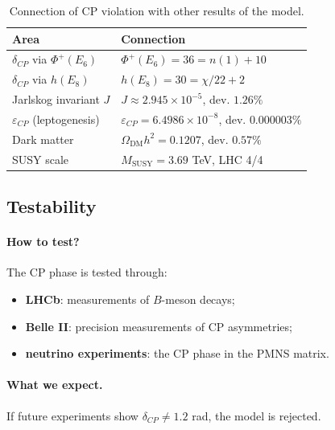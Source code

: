 \documentclass[11pt,a4paper]{article}
\newcommand{\MSUSY}{M_{\text{SUSY}}}
\theoremstyle{definition}
\begin{document}
\begin{table}[htbp]
\centering
\caption{Connection of CP violation with other results of the model.}
\label{tab:cp-links}
\begin{tabular}{p{4cm}p{7cm}}
\toprule
Area & Connection \\ 
\midrule
$\delta_{CP}$ via $\Phi^+(E_6)$ & 
    $\Phi^+(E_6) = 36 = n(1) + 10$ \\[0.3em]
$\delta_{CP}$ via $h(E_8)$ & 
    $h(E_8) = 30 = \chi/22 + 2$ \\[0.3em]
Jarlskog invariant $J$ & 
    $J \approx 2.945 \times 10^{-5}$, dev. $1.26\%$ \\[0.3em]
$\varepsilon_{CP}$ (leptogenesis) & 
    $\varepsilon_{CP} = 6.4986 \times 10^{-8}$, dev. $0.000003\%$ \\[0.3em]
Dark matter & 
    $\Omega_{\text{DM}} h^2 = 0.1207$, dev. $0.57\%$ \\[0.3em]
SUSY scale & 
    $\MSUSY = 3.69$ TeV, LHC 4/4 \\ 
\bottomrule
\end{tabular}
\end{table}

\subsection{Testability}
\label{subsec:cp-falsifiability}

\paragraph{How to test?}
The CP phase is tested through:
\begin{itemize}
    \item \textbf{LHCb}: measurements of $B$-meson decays;
    \item \textbf{Belle II}: precision measurements of CP asymmetries;
    \item \textbf{neutrino experiments}: the CP phase in the PMNS matrix.
\end{itemize}

\paragraph{What we expect.}
If future experiments show $\delta_{CP} \neq 1.2$ rad, 
the model is rejected.
\end{document}
